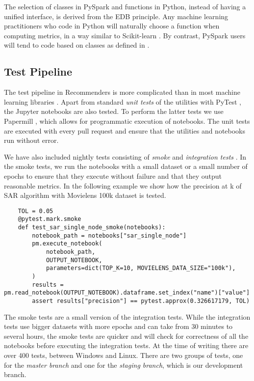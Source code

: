 The selection of classes in PySpark and functions in Python, instead of having a unified
interface, is derived from the EDB principle. Any machine learning practitioners
who code in Python will naturally choose a function when computing metrics, 
in a way similar to Scikit-learn \cite{pedregosa2011scikit}. By contrast, PySpark users 
will tend to code based on classes as defined in \cite{meng2016mllib}. 

\subsection{Test Pipeline}

The test pipeline in Recommenders is more complicated than in most machine learning
libraries \cite{abadi2016tensorflow,paszke2017automatic,pedregosa2011scikit,ke2017lightgbm}.
Apart from standard {\em unit tests} of the utilities with PyTest \cite{krekel2004pytest}, 
the Jupyter notebooks are also tested. To perform the latter tests we use Papermill 
\cite{nteract2017papermill}, which allows for programmatic execution of notebooks. The
unit tests are executed with every pull request and ensure that the utilities and 
notebooks run without error.

We have also included nightly tests consisting of {\em smoke} and {\em integration tests}
\cite{gonzalez-fierro2018beginners}. In the smoke tests, we run the notebooks with a 
small dataset or a small number of epochs to ensure that they execute without failure and that they 
output reasonable metrics. In the following example we show how 
the precision at k of SAR algorithm with Movielens 100k dataset is tested.

\begin{verbatim}
    TOL = 0.05
    @pytest.mark.smoke
    def test_sar_single_node_smoke(notebooks):
        notebook_path = notebooks["sar_single_node"]
        pm.execute_notebook(
            notebook_path,
            OUTPUT_NOTEBOOK,
            parameters=dict(TOP_K=10, MOVIELENS_DATA_SIZE="100k"),
        )
        results = pm.read_notebook(OUTPUT_NOTEBOOK).dataframe.set_index("name")["value"]
        assert results["precision"] == pytest.approx(0.326617179, TOL)
\end{verbatim}

The smoke tests are a small version of the integration tests. While the integration tests
use bigger datasets with more epochs and can take from 30 minutes to several hours, the smoke tests are quicker and
will check for correctness of all the notebooks before executing the integration tests.
At the time of writing there are over 400 tests, between Windows and Linux. There are two groups of tests,
one for the {\em master branch} and one for the {\em staging branch}, which is our development branch.


